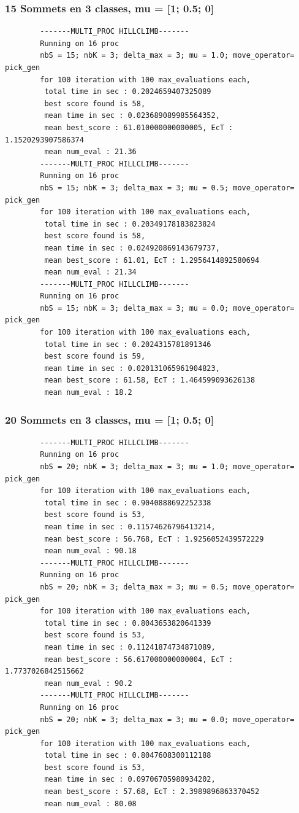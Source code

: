 \documentclass[a4paper]{article}
\begin{document}
		\subsubsection{15 Sommets en 3 classes, mu = [1; 0.5; 0]}
		\begin{verbatim}
		-------MULTI_PROC HILLCLIMB-------
		Running on 16 proc
		nbS = 15; nbK = 3; delta_max = 3; mu = 1.0; move_operator= pick_gen
		for 100 iteration with 100 max_evaluations each, 
		 total time in sec : 0.2024659407325089
		 best score found is 58,
		 mean time in sec : 0.023689089985564352,
		 mean best_score : 61.010000000000005, EcT : 1.1520293907586374
		 mean num_eval : 21.36
		-------MULTI_PROC HILLCLIMB-------
		Running on 16 proc
		nbS = 15; nbK = 3; delta_max = 3; mu = 0.5; move_operator= pick_gen
		for 100 iteration with 100 max_evaluations each, 
		 total time in sec : 0.20349178183823824
		 best score found is 58,
		 mean time in sec : 0.024920869143679737,
		 mean best_score : 61.01, EcT : 1.2956414892580694
		 mean num_eval : 21.34
		-------MULTI_PROC HILLCLIMB-------
		Running on 16 proc
		nbS = 15; nbK = 3; delta_max = 3; mu = 0.0; move_operator= pick_gen
		for 100 iteration with 100 max_evaluations each, 
		 total time in sec : 0.2024315781891346
		 best score found is 59,
		 mean time in sec : 0.020131065961904823,
		 mean best_score : 61.58, EcT : 1.464599093626138
		 mean num_eval : 18.2
		\end{verbatim}
		\subsubsection{20 Sommets en 3 classes, mu = [1; 0.5; 0]}
		\begin{verbatim}
		-------MULTI_PROC HILLCLIMB-------
		Running on 16 proc
		nbS = 20; nbK = 3; delta_max = 3; mu = 1.0; move_operator= pick_gen
		for 100 iteration with 100 max_evaluations each, 
		 total time in sec : 0.9040888692252338
		 best score found is 53,
		 mean time in sec : 0.11574626796413214,
		 mean best_score : 56.768, EcT : 1.9256052439572229
		 mean num_eval : 90.18
		-------MULTI_PROC HILLCLIMB-------
		Running on 16 proc
		nbS = 20; nbK = 3; delta_max = 3; mu = 0.5; move_operator= pick_gen
		for 100 iteration with 100 max_evaluations each, 
		 total time in sec : 0.8043653820641339
		 best score found is 53,
		 mean time in sec : 0.11241874734871089,
		 mean best_score : 56.617000000000004, EcT : 1.7737026842515662
		 mean num_eval : 90.2
		-------MULTI_PROC HILLCLIMB-------
		Running on 16 proc
		nbS = 20; nbK = 3; delta_max = 3; mu = 0.0; move_operator= pick_gen
		for 100 iteration with 100 max_evaluations each, 
		 total time in sec : 0.8047608300112188
		 best score found is 53,
		 mean time in sec : 0.09706705980934202,
		 mean best_score : 57.68, EcT : 2.3989896863370452
		 mean num_eval : 80.08
		\end{verbatim}
\end{document}
